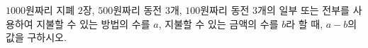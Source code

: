 \hspace*{2mm}\begin{minipage}[t]{\dimexpr\linewidth-2mm\relax}\vspace{0pt}
$1000$원짜리 지폐 $2$장, $500$원짜리 동전 $3$개, $100$원짜리 동전 $3$개의 일부 또는 전부를 사용하여 지불할 수 있는 방법의 수를 $a$, 지불할 수 있는 금액의 수를 $b$라 할 때, $a-b$의 값을 구하시오. \end{minipage}
